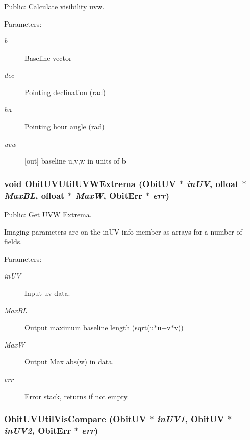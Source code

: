 Public: Calculate visibility uvw. 

\begin{Desc}
\item[Parameters:]
\begin{description}
\item[{\em b}]Baseline vector \item[{\em dec}]Pointing declination (rad) \item[{\em ha}]Pointing hour angle (rad) \item[{\em uvw}][out] baseline u,v,w in units of b \end{description}
\end{Desc}
\subsubsection{\setlength{\rightskip}{0pt plus 5cm}void Obit\-UVUtil\-UVWExtrema ({\bf Obit\-UV} $\ast$ {\em in\-UV}, {\bf ofloat} $\ast$ {\em Max\-BL}, {\bf ofloat} $\ast$ {\em Max\-W}, {\bf Obit\-Err} $\ast$ {\em err})}\label{ObitUVUtil_8h_a0}


Public: Get UVW Extrema. 

Imaging parameters are on the in\-UV info member as arrays for a number of fields. \begin{Desc}
\item[Parameters:]
\begin{description}
\item[{\em in\-UV}]Input uv data. \item[{\em Max\-BL}]Output maximum baseline length (sqrt(u$\ast$u+v$\ast$v)) \item[{\em Max\-W}]Output Max abs(w) in data. \item[{\em err}]Error stack, returns if not empty. \end{description}
\end{Desc}
\subsubsection{ Obit\-UVUtil\-Vis\-Compare ({\bf Obit\-UV} $\ast$ {\em in\-UV1}, {\bf Obit\-UV} $\ast$ {\em in\-UV2}, {\bf Obit\-Err} $\ast$ {\em err})}\label{ObitUVUtil_8h_a3}



